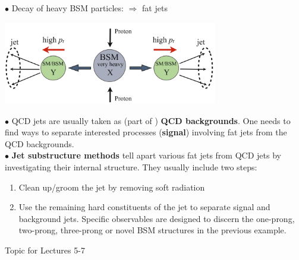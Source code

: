 \documentclass[9pt,a4paper,unknownkeysallowed,xcolor=dvipsnames,aspectratio=43]{beamer}
\begin{document}
\begin{frame}
\vspace{2mm}

{\color{darkred}\Large$\bullet$} Decay of heavy BSM particles: $\Rightarrow$ fat jets\\
\begin{center}
\includegraphics[width=0.7\textwidth]{01/BSM.png}
\end{center}
\vspace{1mm}
{\color{darkred}\Large$\bullet$} QCD jets are usually taken as (part of ) {\bf QCD backgrounds}. One needs to find ways to separate interested processes ({\bf signal}) involving fat jets from the QCD backgrounds.\\
\vspace{1mm}
{\color{darkred}\Large$\bullet$} {\bf\color{darkred} Jet substructure methods} tell apart various fat jets from QCD jets by investigating their internal structure. They usually include two steps:\\
\vspace{1mm}
\begin{enumerate}
    \item Clean up/groom the jet by removing soft radiation
    \vspace{1mm}
    \item Use the remaining hard constituents of the jet to separate signal and background jets. Specific observables are designed to discern the one-prong, two-prong, three-prong or novel BSM structures in the previous example. 
\end{enumerate}
\begin{center}
    {\color{darkred}Topic for Lectures 5-7}
\end{center}
\end{frame}
\end{document}
